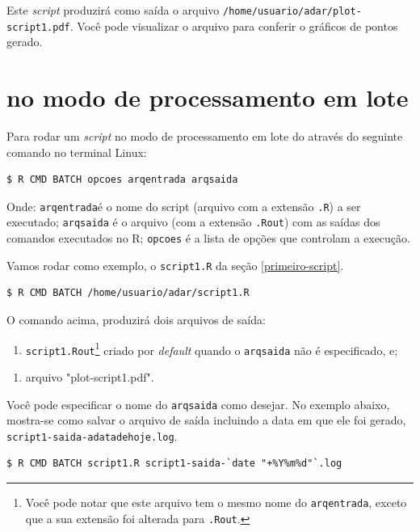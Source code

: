 \documentclass[]{book}
\providecommand{\tightlist}{%
  \setlength{\itemsep}{0pt}\setlength{\parskip}{0pt}}
\let\rmarkdownfootnote\footnote%
\def\footnote{\protect\rmarkdownfootnote}
\begin{document}
Este \emph{script} produzirá como saída o arquivo
\texttt{/home/usuario/adar/plot-script1.pdf}. Você pode visualizar o
arquivo para conferir o gráficos de pontos gerado.

\section{ no modo de processamento em
lote}\label{no-modo-de-processamento-em-lote}

Para rodar um \emph{script} no modo de processamento em lote do através
do seguinte comando no terminal Linux:

\begin{verbatim}
$ R CMD BATCH opcoes arqentrada arqsaida
\end{verbatim}

Onde: \texttt{arqentrada}é o nome do script (arquivo com a extensão
\texttt{.R}) a ser executado; \texttt{arqsaida} é o arquivo (com a
extensão \texttt{.Rout}) com as saídas dos comandos executados no R;
\texttt{opcoes} é a lista de opções que controlam a execução.

Vamos rodar como exemplo, o \texttt{script1.R} da seção
\ref{primeiro-script}.

\begin{verbatim}
$ R CMD BATCH /home/usuario/adar/script1.R
\end{verbatim}

O comando acima, produzirá dois arquivos de saída:

\begin{enumerate}
\def\labelenumi{\arabic{enumi}.}
\tightlist
\item
  \texttt{script1.Rout}\footnote{Você pode notar que este arquivo tem o
    mesmo nome do \texttt{arqentrada}, exceto que a sua extensão foi
    alterada para \texttt{.Rout}.} criado por \emph{default} quando o
  \texttt{arqsaida} não é especificado, e;
\end{enumerate}

\begin{enumerate}
\def\labelenumi{\arabic{enumi}.}
\setcounter{enumi}{1}
\tightlist
\item
  arquivo "plot-script1.pdf".
\end{enumerate}

Você pode especificar o nome do \texttt{arqsaida} como desejar. No
exemplo abaixo, mostra-se como salvar o arquivo de saída incluindo a
data em que ele foi gerado, \texttt{script1-saida-adatadehoje.log}.

\begin{verbatim}
$ R CMD BATCH script1.R script1-saida-`date "+%Y%m%d"`.log
\end{verbatim}
\end{document}
